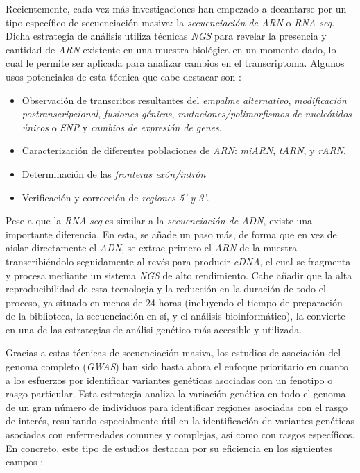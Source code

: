 \documentclass[IB,BIB]{TFUOC}%
\begin{document}
Recientemente, cada vez más investigaciones han empezado a decantarse por un tipo específico de secuenciación masiva: la \textit{secuenciación de ARN} o \textit{RNA-seq}. Dicha estrategia de análisis utiliza técnicas \textit{NGS} para revelar la presencia y cantidad de \textit{ARN} existente en una muestra biológica en un momento dado, lo cual le permite ser aplicada para analizar cambios en el transcriptoma. Algunos usos potenciales de esta técnica que cabe destacar son \cite{wang_rna-seq_2009} \cite{noauthor_rna-seq_2023}:

\footnotesize

\begin{itemize}
    \item Observación de transcritos resultantes del \textit{empalme alternativo}, \textit{modificación postranscripcional}, \textit{fusiones génicas}, \textit{mutaciones/polimorfismos de nucleótidos únicos} o \textit{SNP} y \textit{cambios de expresión de genes}.
    \item Caracterización de diferentes poblaciones de \textit{ARN}: \textit{miARN}, \textit{tARN}, y \textit{rARN}.
    \item Determinación de las \textit{fronteras exón/intrón}
    \item Verificación y corrección de \textit{regiones 5' y 3'}.
\end{itemize}

\normalsize

Pese a que la \textit{RNA-seq} es similar a la \textit{secuenciación de ADN}, existe una importante diferencia. En esta, se añade un paso más, de forma que en vez de aislar directamente el \textit{ADN}, se extrae primero el \textit{ARN} de la muestra transcribiéndolo seguidamente al revés para producir \textit{cDNA}, el cual se fragmenta y procesa mediante un sistema \textit{NGS} de alto rendimiento. Cabe añadir que la alta reproducibilidad de esta tecnologia y la reducción en la duración de todo el proceso, ya situado en menos de 24 horas (incluyendo el tiempo de preparación de la biblioteca, la secuenciación en sí, y el análisis bioinformático), la convierte en una de las estrategias de análisi genético más accesible y utilizada.

Gracias a estas técnicas de secuenciación masiva, los estudios de asociación del genoma completo (\textit{GWAS}) han sido hasta ahora el enfoque prioritario en cuanto a los esfuerzos por identificar variantes genéticas asociadas con un fenotipo o rasgo particular. Esta estrategia analiza la variación genética en todo el genoma de un gran número de individuos para identificar regiones asociadas con el rasgo de interés, resultando especialmente útil en la identificación de variantes genéticas asociadas con enfermedades comunes y complejas, así como con rasgos específicos. En concreto, este tipo de estudios destacan por su eficiencia en los siguientes campos \cite{tam_benefits_2019, garrido_martin_multivariate_2020, qi_genetic_2022, turner_quality_2011, noauthor_genome-wide_2023}:
\end{document}
